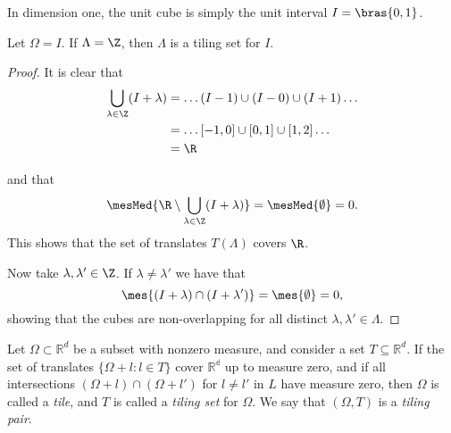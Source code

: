 In dimension one, the unit cube is simply the unit interval $I=\bras{0,1}$.
\begin{theorem}  %
    Let $\Omega = I$. If $\Lambda=\Z$, then $\Lambda$ is a tiling set for $I$.
\end{theorem}

\begin{proof}
    It is clear that
    \begin{align*}
        \bigcup_{\lambda\in \Z} (I + \lambda) &= \dots (I-1) \cup (I-0) \cup (I+1) \dots\\ 
        &= \dots [-1,0] \cup [0,1] \cup [1,2] \dots\\
        &= \R
    \end{align*}
    
    and that  %
    \begin{align*}  %
        \mesMed{\R \setminus \bigcup_{\lambda\in \Z} (I + \lambda) } = \mesMed{\emptyset} = 0.
    \end{align*}
    This shows that the set of translates $T(\Lambda)$ covers $\R$. %
    
    Now take $\lambda,\lambda' \in \Z$. %
    If $\lambda \neq \lambda'$ we have that 
    \begin{equation*}
        \mes{(I+\lambda) \cap (I+\lambda')} = \mes{\emptyset} = 0,
    \end{equation*}
    showing that the cubes are non-overlapping for all distinct $\lambda , \lambda' \in \Lambda$. 
\end{proof}


\begin{definition}
    Let $\Omega \subset \mathbb{R}^d$ be a subset with nonzero measure, and consider a set $T \subseteq \mathbb{R}^d$. If the set of translates ${}$$\{\Omega+l: l\in T\}$ cover $\mathbb{R^d}$ up to measure zero, and if all intersections $(\Omega+l) \cap (\Omega+l')$  for $l\neq l'$ in $L$ have measure zero, then $\Omega$ is called a \emph{tile}, and $T$ is called a \emph{tiling set} for $\Omega$. We say that $(\Omega, T)$ is a \emph{tiling pair}. 
\end{definition}

